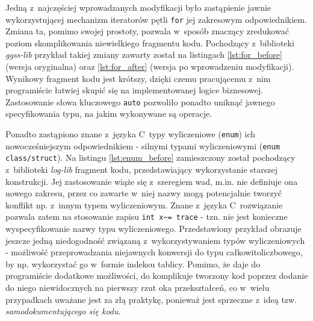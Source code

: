 Jedną z~najczęściej wprowadzanych modyfikacji było zastąpienie jawnie wykorzystującej mechanizm iteratorów pętli \lstinline{for} jej zakresowym odpowiednikiem. Zmiana ta, pomimo swojej prostoty, pozwala w~sposób znaczący zredukować poziom skomplikowania niewielkiego fragmentu kodu. Pochodzący z~biblioteki \emph{ggss-lib} przykład takiej zmiany zawarty został na listingach \ref{lst:for_before} (wersja oryginalna) oraz \ref{lst:for_after} (wersja po wprowadzeniu modyfikacji). Wynikowy fragment kodu jest krótszy, dzięki czemu pracującemu z~nim programiście łatwiej skupić się na implementowanej logice biznesowej. Zastosowanie słowa kluczowego \lstinline{auto} pozwoliło ponadto uniknąć jawnego specyfikowania typu, na jakim wykonywane są operacje.





Ponadto zastąpiono znane z~języka C~typy wyliczeniowe (\lstinline{enum}) ich nowocześniejszym odpowiednikiem - silnymi typami wyliczeniowymi (\lstinline{enum class/struct}). Na listingu \ref{lst:enum_before} zamieszczony został pochodzący z~biblioteki \emph{log-lib} fragment kodu, przedstawiający wykorzystanie starszej konstrukcji. Jej zastosowanie wiąże się z~szeregiem wad, m.in. nie definiuje ona nowego zakresu, przez co zawarte w~niej nazwy mogą potencjalnie tworzyć konflikt np. z~innym typem wyliczeniowym. Znane z~języka C~rozwiązanie pozwala zatem na stosowanie zapisu \lstinline{int x~= trace} - tzn. nie jest konieczne wyspecyfikowanie nazwy typu wyliczeniowego. Przedstawiony przykład obrazuje jeszcze jedną niedogodność związaną z~wykorzystywaniem typów wyliczeniowych - możliwość przeprowadzania niejawnych konwersji do typu całkowitoliczbowego, by np. wykorzystać go w~formie indeksu tablicy. Pomimo, że daje do programiście dodatkowe możliwości, do komplikuje tworzony kod poprzez dodanie do niego niewidocznych na pierwszy rzut oka przekształceń, co w~wielu przypadkach uważane jest za złą praktykę, ponieważ jest sprzeczne z~ideą tzw. \emph{samodokumentującego się kodu}.

